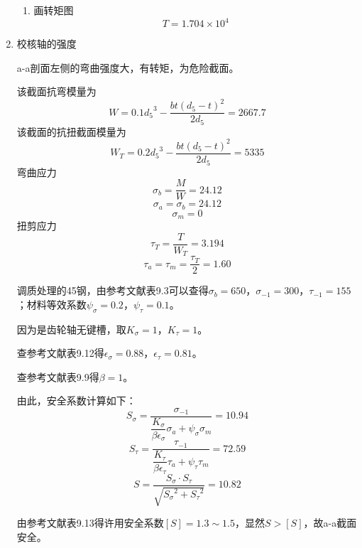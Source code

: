 \begin{enumerate}[A]
\begin{enumerate}[a]
		\item 画转矩图$$T=1.704\times 10^4$$
	\end{enumerate}
	\item 校核轴的强度
	\par a-a剖面左侧的弯曲强度大，有转矩，为危险截面。
	\par 该截面抗弯模量为
	$$W=0.1{d_5}^3-\dfrac{bt\left(d_5-t\right)^2}{2d_5}=2667.7$$
	该截面的抗扭截面模量为
	$$W_T=0.2{d_5}^3-\dfrac{bt\left(d_5-t\right)^2}{2d_5}=5335$$
	弯曲应力$$\sigma_b=\dfrac{M}{W}=24.12$$
	$$\sigma_a=\sigma_b=24.12$$
	$$\sigma_m=0$$
	扭剪应力
	$$\tau_T=\dfrac{T}{W_T}=3.194$$
	$$\tau_a=\tau_m=\dfrac{\tau_T}{2}=1.60$$
	\par 调质处理的45钢，由参考文献\cite{2}表9.3可以查得$\sigma_b=650$，$\sigma_{-1}=300$，$\tau_{-1}=155$；材料等效系数$\psi_\sigma=0.2$，$\psi_\tau=0.1$。
	\par 因为是齿轮轴无键槽，取$K_\sigma=1$，$K_\tau=1$。
	\par 查参考文献\cite{2}表9.12得$\epsilon_\sigma=0.88$，$\epsilon_\tau=0.81$。
	\par 查参考文献\cite{2}表9.9得$\beta=1$。
	\par 由此，安全系数计算如下：
	$$S_\sigma=\dfrac{\sigma_{-1}}{\dfrac{K_\sigma}{\beta \epsilon_\sigma}\sigma_a+\psi_\sigma \sigma_m}=10.94$$
	$$S_\tau=\dfrac{\tau_{-1}}{\dfrac{K_\tau}{\beta \epsilon_\tau}\tau_a+\psi_\tau \tau_m}=72.59$$
	$$S=\dfrac{S_\sigma\cdot S_\tau}{\sqrt{{S_\sigma}^2+{S_\tau}^2}}=10.82$$
	\par 由参考文献\cite{2}表9.13得许用安全系数$\left[S\right]=1.3\sim 1.5$，显然$S>\left[S\right]$，故a-a截面安全。
	

\end{enumerate}
